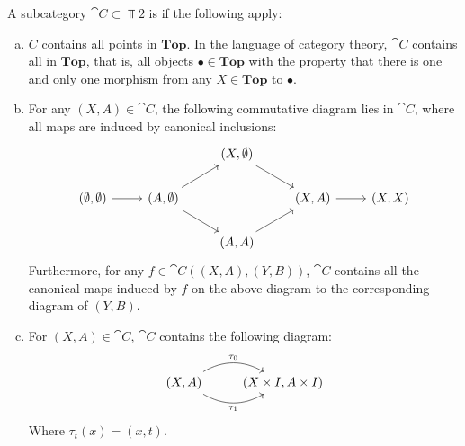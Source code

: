 \begin{definition}
A subcategory $\cat{C}\subset \Top{2}$ is  if the following apply:
\begin{enumerate}[(a)]
\item $C$ contains all points in $\mathbf{Top}$. In the language of category theory, $\cat{C}$ contains all  in $\mathbf{Top}$, that is, all objects $\bullet\in\mathbf{Top}$ with the property that there is one and only one morphism from any $X\in\mathbf{Top}$ to $\bullet$.
\item For any $(X,A)\in \cat{C}$, the following commutative diagram lies in $\cat{C}$, where all maps are induced by canonical inclusions:
\[\begin{tikzcd}
                                  &                                       & {(X,\emptyset)} \arrow[rd] &                   &         \\
{(\emptyset,\emptyset)} \arrow[r] & {(A,\emptyset)} \arrow[ru] \arrow[rd] &                            & {(X,A)} \arrow[r] & {(X,X)} \\
                                  &                                       & {(A,A)} \arrow[ru]         &                   &        
\end{tikzcd}\]
Furthermore, for any $f\in \cat{C}((X,A),(Y,B))$, $\cat{C}$ contains all the canonical maps induced by $f$ on the above diagram to the corresponding diagram of $(Y,B)$.
\item For $(X,A)\in \cat{C}$, $\cat{C}$ contains the following diagram:
\[\begin{tikzcd}
{(X,A)} \arrow[r, "\tau_1"', bend right] \arrow[r, "\tau_0", bend left] & {(X\times I,A\times I)}
\end{tikzcd}\]
Where $\tau_t(x)=(x,t)$.
\end{enumerate}
\end{definition}

